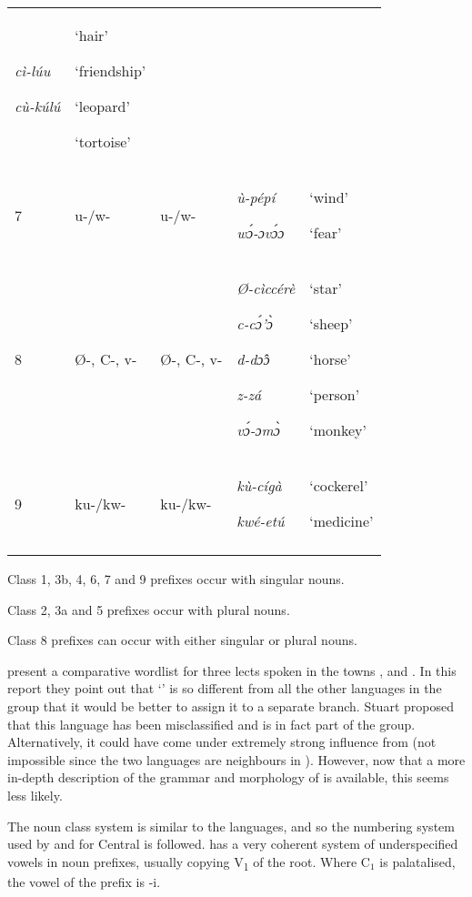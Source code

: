 \documentclass[output=paper]{langsci/langscibook}
\begin{document}
\begin{table}
\begin{tabularx}{\textwidth}{lllQQ}
\textit{cì-lúu}

\textit{cù-kúlú}	& `hair'

`friendship'

`leopard'

`tortoise'\\
7	& u-/w-	& u-/w-	& \textit{ù-pépí}

\textit{wɔ́-ɔvɔ́ɔ}	& `wind'

`fear'\\
8	& Ø-, C-, v-	& Ø-, C-, v-	& \textit{Ø-cìccérè}

\textit{c-cɔ́’ɔ̀}

\textit{d-dɔ̂ɔ}

\textit{z-zá}

\textit{vɔ́-ɔmɔ̀}	& `star'

`sheep'

`horse'

`person'

`monkey'\\
9	& ku-/kw-	& ku-/kw-	& \textit{kù-cígà}

\textit{kwé-etú}	& `cockerel'

`medicine'\\ 
\lspbottomrule
\end{tabularx}
\end{table}

Class 1, 3b, 4, 6, 7 and 9 prefixes occur with singular nouns.
\smallskip 

Class 2, 3a and 5 prefixes occur with plural nouns.
\smallskip 


Class 8 prefixes can occur with either singular or plural nouns.
\smallskip 


\citet{DettweilerDettweiler2003a} present a comparative wordlist for three lects spoken in the towns ,  and . In this report they point out that ‘’ is so different from all the other languages in the group that it would be better to assign it to a separate branch. Stuart \citet{McGill2007,McGill2009,McGill2010} proposed that this language has been misclassified and is in fact part of the  group. Alternatively, it could have come under extremely strong influence from  (not impossible since the two languages are neighbours in ). However, now that a more in-depth description of the grammar and morphology of  is available, this seems less likely. 

The  noun class system is similar to the  languages, and so the numbering system used by \citet{Hoffmann1963} and \citet{Crozier1984} for Central  is followed.  has a very coherent system of underspecified vowels in noun prefixes, usually copying V\textsubscript{1} of the root. Where C$_1$ is palatalised, the vowel of the prefix is -i.
\end{document}
